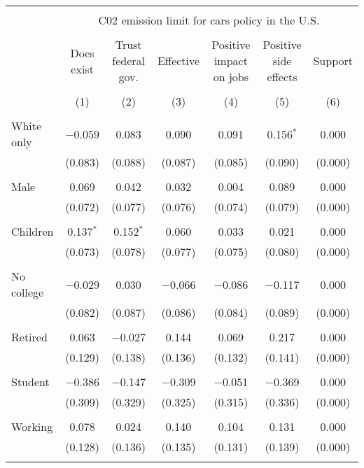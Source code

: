 
\begin{tabular}{@{\extracolsep{5pt}}lcccccc} 
\\[-1.8ex]\hline 
\hline \\[-1.8ex] 
 & \multicolumn{6}{c}{C02 emission limit for cars policy in the U.S.} \\ 
\cline{2-7} 
\\[-1.8ex] & Does exist & Trust federal gov. & Effective & Positive impact on jobs & Positive side effects & Support \\ 
\\[-1.8ex] & (1) & (2) & (3) & (4) & (5) & (6)\\ 
\hline \\[-1.8ex] 
 White only & $-$0.059 & 0.083 & 0.090 & 0.091 & 0.156$^{*}$ & 0.000 \\ 
  & (0.083) & (0.088) & (0.087) & (0.085) & (0.090) & (0.000) \\ 
  & & & & & & \\ 
 Male & 0.069 & 0.042 & 0.032 & 0.004 & 0.089 & 0.000 \\ 
  & (0.072) & (0.077) & (0.076) & (0.074) & (0.079) & (0.000) \\ 
  & & & & & & \\ 
 Children & 0.137$^{*}$ & 0.152$^{*}$ & 0.060 & 0.033 & 0.021 & 0.000 \\ 
  & (0.073) & (0.078) & (0.077) & (0.075) & (0.080) & (0.000) \\ 
  & & & & & & \\ 
 No college & $-$0.029 & 0.030 & $-$0.066 & $-$0.086 & $-$0.117 & 0.000 \\ 
  & (0.082) & (0.087) & (0.086) & (0.084) & (0.089) & (0.000) \\ 
  & & & & & & \\ 
 Retired & 0.063 & $-$0.027 & 0.144 & 0.069 & 0.217 & 0.000 \\ 
  & (0.129) & (0.138) & (0.136) & (0.132) & (0.141) & (0.000) \\ 
  & & & & & & \\ 
 Student & $-$0.386 & $-$0.147 & $-$0.309 & $-$0.051 & $-$0.369 & 0.000 \\ 
  & (0.309) & (0.329) & (0.325) & (0.315) & (0.336) & (0.000) \\ 
  & & & & & & \\ 
 Working & 0.078 & 0.024 & 0.140 & 0.104 & 0.131 & 0.000 \\ 
  & (0.128) & (0.136) & (0.135) & (0.131) & (0.139) & (0.000) \\ 
  & & & & & & \\ 

\end{tabular}
